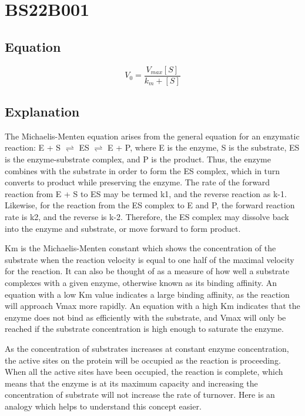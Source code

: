 
\section{BS22B001}
\subsection{Equation}

\begin{equation}
    V_0 = \frac{V_{max}[S]}{k_m+[S]}
\end{equation}
\footnotemark

\subsection{Explanation}

The Michaelis-Menten equation arises from the general equation for an enzymatic reaction:
E + S $\rightleftharpoons$  ES $\rightleftharpoons$  E + P, where E is the enzyme, S is the substrate, ES is the enzyme-substrate complex, and P is the product. Thus, the enzyme combines with the substrate in order to form the ES complex, which in turn converts to product while preserving the enzyme. The rate of the forward reaction from E + S to ES may be termed k1, and the reverse reaction as k-1. Likewise, for the reaction from the ES complex to E and P, the forward reaction rate is k2, and the reverse is k-2. Therefore, the ES complex may dissolve back into the enzyme and substrate, or move forward to form product. 



Km is the Michaelis-Menten constant which shows the concentration of the substrate when the reaction velocity is equal to one half of the maximal velocity for the reaction. It can also be thought of as a measure of how well a substrate complexes with a given enzyme, otherwise known as its binding affinity. An equation with a low Km value indicates a large binding affinity, as the reaction will approach Vmax more rapidly. An equation with a high Km indicates that the enzyme does not bind as efficiently with the substrate, and Vmax will only be reached if the substrate concentration is high enough to saturate the enzyme.

As the concentration of substrates increases at constant enzyme concentration, the active sites on the protein will be occupied as the reaction is proceeding. When all the active sites have been occupied, the reaction is complete, which means that the enzyme is at its maximum capacity and increasing the concentration of substrate will not increase the rate of turnover. Here is an analogy which helps to understand this concept easier.

